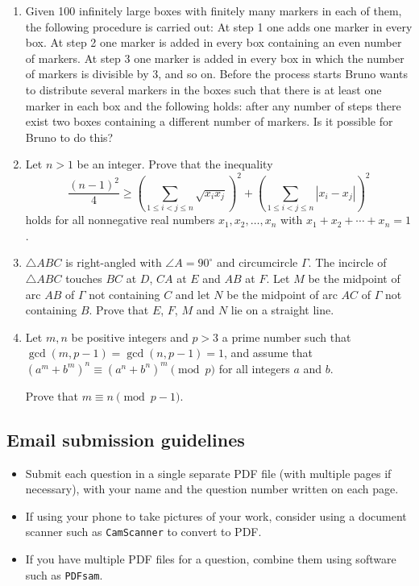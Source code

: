\documentclass[12pt]{article}
\begin{document}
\begin{enumerate}
\item %
Given 100 infinitely large boxes with finitely many markers in each of them, the following procedure is carried out: At step 1 one adds one marker in every box. At step 2 one marker is added in every box containing an even number of markers. At step 3 one marker is added in every box in which the number of markers is divisible by 3, and so on. Before the process starts Bruno wants to distribute several markers in the boxes such that there is at least one marker in each box and the following holds: after any number of steps there exist two boxes containing a different number of markers. Is it possible for Bruno to do this?


\item %
Let $n > 1$ be an integer. Prove that the inequality
\[ \frac{(n-1)^2}{4} \geq \left(\sum_{1 \leq i < j \leq n} \sqrt{x_i x_j}\right)^2 + \left(\sum_{1 \leq i < j \leq n} \left\lvert x_i-x_j \right\rvert \right)^2 \]
holds for all nonnegative real numbers $x_1, x_2, \dotsc, x_n$ with $x_1 +x_2 +\dotsb +x_n = 1$.


\item %
$\triangle ABC$ is right-angled with $\angle A=90^\circ$ and circumcircle $\Gamma$. The incircle of $\triangle ABC$ touches $BC$ at $D$, $CA$ at $E$ and $AB$ at $F$. Let $M$ be the midpoint of arc $AB$ of $\Gamma$ not containing $C$ and let $N$ be the midpoint of arc $AC$ of $\Gamma$ not containing $B$. Prove that $E$, $F$, $M$ and $N$ lie on a straight line.


\item %
Let $m,n$ be positive integers and $p > 3$ a prime number such that $\gcd(m,p-1) = \gcd(n,p-1) = 1$, and assume that $(a^m + b^m)^n \equiv (a^n + b^n)^m \pmod{p}$ for all integers $a$ and $b$.

Prove that $m \equiv n \pmod{p-1}$.


\end{enumerate}


\subsection*{Email submission guidelines}

\begin{itemize}
\item Submit each question in a single separate PDF file (with multiple pages if necessary), with your name and the question number written on each page.
\item If using your phone to take pictures of your work, consider using a document scanner such as \verb!CamScanner! to convert to PDF.
\item If you have multiple PDF files for a question, combine them using software such as \verb!PDFsam!.
\end{itemize}
\end{document}
